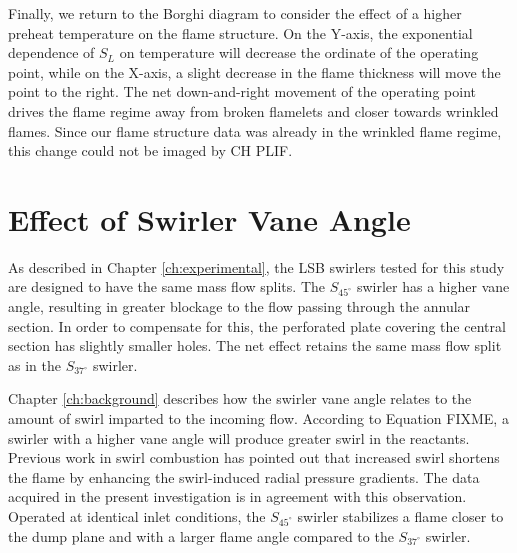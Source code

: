 Finally, we return to the Borghi diagram to consider the effect of a higher preheat temperature on the flame structure.
On the Y-axis, the exponential dependence of \(S_L\) on temperature will decrease the ordinate of the operating point, while on the X-axis, a slight decrease in the flame thickness will move the point to the right.
The net down-and-right movement of the operating point drives the flame regime away from broken flamelets and closer towards wrinkled flames.
Since our flame structure data was already in the wrinkled flame regime, this change could not be imaged by CH PLIF.

\section{Effect of Swirler Vane Angle}
\label{sec:lsb-effect-of-swirler-vane-angle}

As described in Chapter \ref{ch:experimental}, the LSB swirlers tested for this study are designed to have the same mass flow splits.
The \(S_{45^\circ}\) swirler has a higher vane angle, resulting in greater blockage to the flow passing through the annular section.
In order to compensate for this, the perforated plate covering the central section has slightly smaller holes.
The net effect retains the same mass flow split as in the \(S_{37^\circ}\) swirler.

Chapter \ref{ch:background} describes how the swirler vane angle relates to the amount of swirl imparted to the incoming flow.
According to Equation FIXME, a swirler with a higher vane angle will produce greater swirl in the reactants.
Previous work in swirl combustion\cite{1992-chan,1986-starner} has pointed out that increased swirl shortens the flame by enhancing the swirl-induced radial pressure gradients.
The data acquired in the present investigation is in agreement with this observation.
Operated at identical inlet conditions, the \(S_{45^\circ}\) swirler stabilizes a flame closer to the dump plane and with a larger flame angle compared to the \(S_{37^\circ}\) swirler.

